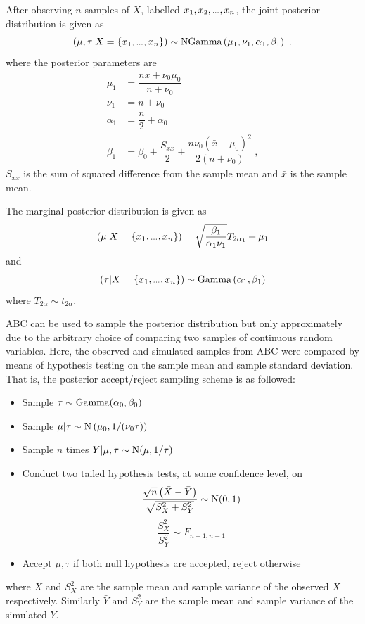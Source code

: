 \documentclass[a4paper,10pt]{article}
\newcommand{\dotdotdot}{\vphantom{.}_{\cdots}}
\begin{document}
After observing $n$ samples of $X$, labelled $x_1,x_2,\dotdotdot ,x_n$, the joint posterior distribution is given as
\begin{equation}
(\mu,\tau|X=\{x_1,\dotdotdot ,x_n\})\sim\textup{NGamma}
\left(
	\mu_1,
	\nu_1,
	\alpha_1,
	\beta_1
\right) \ .
\end{equation}
where the posterior parameters are
\begin{align}
\mu_1 &= \dfrac{n\bar{x}+\nu_0\mu_0}{n+\nu_0} \\
\nu_1 &= n+\nu_0 \\
\alpha_1 &= \dfrac{n}{2}+\alpha_0 \\
\beta_1 &= \beta_0+\dfrac{S_{xx}}{2}+\dfrac{n\nu_0(\bar{x}-\mu_0)^2}{2(n+\nu_0)} \ ,
\end{align}
$S_{xx}$ is the sum of squared difference from the sample mean and $\bar{x}$ is the sample mean.

The marginal posterior distribution is given as
\begin{equation}
(\mu|X=\{x_1,\dotdotdot ,x_n\}) = \sqrt{\dfrac{\beta_1}{\alpha_1\nu_1}} T_{2\alpha_1}
+ \mu_1
\end{equation}
and
\begin{equation}
(\tau|X=\{x_1,\dotdotdot ,x_n\}) \sim \textup{Gamma}\left(
\alpha_1,\beta_1
\right)
\end{equation}
where $T_{2\alpha}\sim t_{2\alpha}$.

ABC can be used to sample the posterior distribution but only approximately due to the arbitrary choice of comparing two samples of continuous random variables. Here, the observed and simulated samples from ABC were compared by means of hypothesis testing on the sample mean and sample standard deviation. That is, the posterior accept/reject sampling scheme is as followed:
\begin{itemize}
	\item Sample $\tau\sim\textup{Gamma}(\alpha_0,\beta_0)$
	\item Sample $\mu|\tau\sim\textup{N}\left(\mu_0,1/(\nu_0\tau)\right)$
	\item Sample $n$ times $Y|\mu,\tau\sim\textup{N}(\mu,1/\tau)$
	\item Conduct two tailed hypothesis tests, at some confidence level, on
	\begin{equation}
	\dfrac{\sqrt{n}\left(\bar{X}-\bar{Y}\right)}{\sqrt{S_X^2+S_Y^2}}\sim\textup{N}(0,1)
	\end{equation}
	\begin{equation}
	\dfrac{S_X^2}{S_Y^2}\sim F_{n-1,n-1}
	\end{equation}
	\item Accept $\mu,\tau$ if both null hypothesis are accepted, reject otherwise
\end{itemize}
where $\bar{X}$ and $S_X^2$ are the sample mean and sample variance of the observed $X$ respectively. Similarly $\bar{Y}$ and $S_Y^2$ are the sample mean and sample variance of the simulated $Y$.
\end{document}
